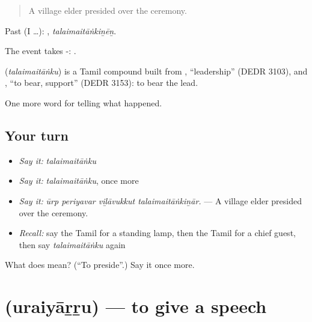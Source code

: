 \begin{quote}
A village elder presided over the ceremony.
\end{quote}

Past (I …): , \emph{talaimaitāṅkiṉēṉ}.

The event takes -:  .

\begin{cousinweb}
\textbf{} (\emph{talaimaitāṅku}) is a Tamil compound built from , \textquotedblleft{}leadership\textquotedblright{} (DEDR 3103), and , \textquotedblleft{}to bear, support\textquotedblright{} (DEDR 3153): to bear the lead.
\end{cousinweb}

\begin{grammarlens}[title={What you've built}]
One more word for telling what happened.
\end{grammarlens}

\subsection*{Your turn}
\begin{itemize}
\raggedright
  \item \emph{Say it:} \emph{talaimaitāṅku}
  \item \emph{Say it:} \emph{talaimaitāṅku}, once more
  \item \emph{Say it:} \emph{ūrp periyavar viḻāvukkut talaimaitāṅkiṉār.} — A village elder presided over the ceremony.
  \item \emph{Recall:} say the Tamil for a standing lamp, then the Tamil for a chief guest, then say \emph{talaimaitāṅku} again
\end{itemize}

\begin{tcolorbox}[breakable,colback=teal!4,colframe=teal!35!black,title={Before you move on}]
What does  mean? (\textquotedblleft{}To preside\textquotedblright{}.) Say it once more.
\end{tcolorbox}
\section[\texorpdfstring{\ta{உரையாற்று} (uraiyāṟṟu)}{உரையாற்று (uraiyāṟṟu)}]{ (uraiyāṟṟu) — to give a speech}

\label{lesson:TA-C318-uraiyarru}



